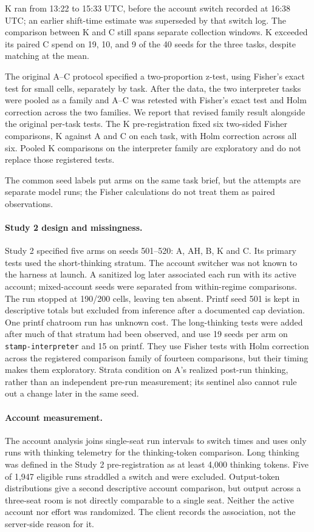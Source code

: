 K ran from 13:22 to 15:33 UTC, before the account switch recorded at 16:38 UTC; an earlier shift-time estimate was superseded by that switch log. The comparison between K and C still spans separate collection windows. K exceeded its paired C spend on 19, 10, and 9 of the 40 seeds for the three tasks, despite matching at the mean.

The original A--C protocol specified a two-proportion z-test, using Fisher's exact test for small cells, separately by task. After the data, the two interpreter tasks were pooled as a family and A--C was retested with Fisher's exact test and Holm correction across the two families. We report that revised family result alongside the original per-task tests. The K pre-registration fixed six two-sided Fisher comparisons, K against A and C on each task, with Holm correction across all six. Pooled K comparisons on the interpreter family are exploratory and do not replace those registered tests.


The common seed labels put arms on the same task brief, but the attempts are separate model runs; the Fisher calculations do not treat them as paired observations.

\paragraph{Study 2 design and missingness.}
Study 2 specified five arms on seeds 501--520: A, AH, B, K and C. Its primary tests used the short-thinking stratum. The account switcher was not known to the harness at launch. A sanitized log later associated each run with its active account; mixed-account seeds were separated from within-regime comparisons. The run stopped at 190/200 cells, leaving ten absent. Printf seed 501 is kept in descriptive totals but excluded from inference after a documented cap deviation. One printf chatroom run has unknown cost. The long-thinking tests were added after much of that stratum had been observed, and use 19 seeds per arm on \texttt{stamp-interpreter} and 15 on printf. They use Fisher tests with Holm correction across the registered comparison family of fourteen comparisons, but their timing makes them exploratory. Strata condition on A's realized post-run thinking, rather than an independent pre-run measurement; its sentinel also cannot rule out a change later in the same seed.

\paragraph{Account measurement.}
The account analysis joins single-seat run intervals to switch times and uses only runs with thinking telemetry for the thinking-token comparison. Long thinking was defined in the Study 2 pre-registration as at least 4,000 thinking tokens. Five of 1,947 eligible runs straddled a switch and were excluded. Output-token distributions give a second descriptive account comparison, but output across a three-seat room is not directly comparable to a single seat. Neither the active account nor effort was randomized. The client records the association, not the server-side reason for it.

